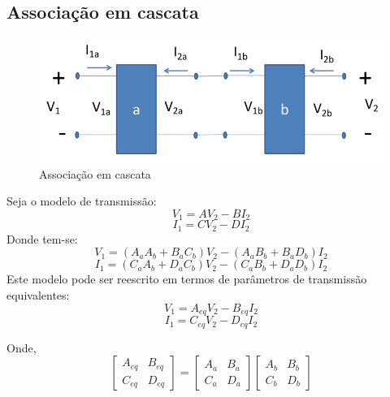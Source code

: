 \documentclass[a4paper, 12pt]{article}
\begin{document}
		\subsection{Associação em cascata}
		\begin{figure}[h]
			\centering
			\includegraphics[scale=0.4]{a12.png}
			\caption{Associação em cascata}
		\end{figure}
		Seja o modelo de transmissão:
		\begin{equation}
			V_1 = AV_2 - BI_2
		\end{equation}
		\begin{equation}
			I_1 = CV_2 - DI_2
		\end{equation}
		Donde tem-se:
		\begin{equation}
			V_1 = (A_aA_b + B_aC_b)V_2 - (A_aB_b+B_aD_b)I_2
		\end{equation}
		\begin{equation}
			I_1 = (C_aA_b + D_aC_b)V_2 - (C_aB_b+D_aD_b)I_2
		\end{equation}
		Este modelo pode ser reescrito em termos de parâmetros
de transmissão equivalentes:
		\begin{equation}
			V_1 = A_{eq}V_2 - B_{eq}I_2
		\end{equation}
		\begin{equation}
			I_1 = C_{eq}V_2 - D_{eq}I_2
		\end{equation}

		Onde,
		\begin{equation}
			\begin{bmatrix}
				A_{eq} & B_{eq}\\
				C_{eq} & D_{eq}				
			\end{bmatrix} = \begin{bmatrix}
			A_a & B_a \\
			C_a & D_a
			\end{bmatrix}
			\begin{bmatrix}
			A_b & B_b\\
			C_b & D_b
			\end{bmatrix}
		\end{equation}
\end{document}
